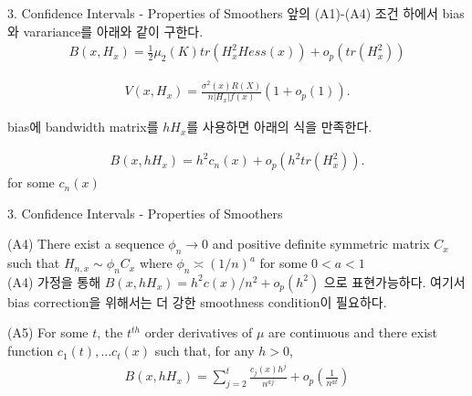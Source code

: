\documentclass[mathserif]{beamer}
\begin{document}
\begin{frame}{3. Confidence Intervals - Properties of Smoothers}
앞의 (A1)-(A4) 조건 하에서 bias와 varariance를 아래와 같이 구한다.
\begin{align}
    B(x,H_x) = \frac{1}{2}\mu_2(K)tr(H_x^2Hess(x)) + o_p(tr(H_x^2))
\end{align}

\begin{align}
    V(x,H_x) = \frac{\sigma^2(x)R(X)}{n|H_x|f(x)}(1+o_p(1)).
\end{align}

bias에 bandwidth matrix를 $hH_x$를 사용하면 아래의 식을 만족한다.

\begin{align*}
    B(x,hH_x) = h^2c_n(x) + o_p(h^2tr(H_x^2)).
\end{align*}
for some $c_n(x)$\\
\end{frame}


\begin{frame}{3. Confidence Intervals - Properties of Smoothers}

(A4) There exist a sequence $\phi_n \rightarrow 0 $ and positive definite symmetric matrix $C_x$ such that $H_{n,x}\sim \phi_nC_x$ where $\phi_n \asymp (1/n)^a$ for some $0<a<1$\\
(A4) 가정을 통해 $B(x,hH_x)=h^2c(x)/n^2 + o_p(h^2)$ 으로 표현가능하다. 여기서 bias correction을 위해서는 더 강한 smoothness condition이 필요하다.
\begin{tcolorbox}[
  colback=Magenta!5!white,
  colframe=Magenta!75!black,
  title={Assumptions}]
(A5) For some $t$, the $t^{th}$ order derivatives of $\mu$ are continuous and there exist function $c_1(t),...c_t(x)$ such that, for any $h>0$,
\begin{align*}
    B(x,hH_x) = \sum_{j=2}^t\frac{c_j(x)h^j}{n^{aj}}+o_p(\frac{1}{n^{at}})
\end{align*}
\end{tcolorbox}


\end{frame}
\end{document}
